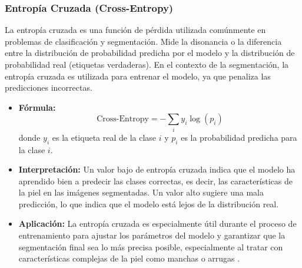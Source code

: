 \subsubsection{Entropía Cruzada (Cross-Entropy)}  
La entropía cruzada es una función de pérdida utilizada comúnmente en problemas de clasificación y segmentación. Mide la disonancia o la diferencia entre la distribución de probabilidad predicha por el modelo y la distribución de probabilidad real (etiquetas verdaderas). En el contexto de la segmentación, la entropía cruzada es utilizada para entrenar el modelo, ya que penaliza las predicciones incorrectas.  
\begin{itemize}
    \item \textbf{Fórmula:}  
    \[
    \text{Cross-Entropy} = -\sum_{i} y_i \log(p_i)
    \]
    donde \( y_i \) es la etiqueta real de la clase \( i \) y \( p_i \) es la probabilidad predicha para la clase \( i \).
    \item \textbf{Interpretación:} Un valor bajo de entropía cruzada indica que el modelo ha aprendido bien a predecir las clases correctas, es decir, las características de la piel en las imágenes segmentadas. Un valor alto sugiere una mala predicción, lo que indica que el modelo está lejos de la distribución real.
    \item \textbf{Aplicación:} La entropía cruzada es especialmente útil durante el proceso de entrenamiento para ajustar los parámetros del modelo y garantizar que la segmentación final sea lo más precisa posible, especialmente al tratar con características complejas de la piel como manchas o arrugas \parencite{autor2022crossentropy}.
\end{itemize}